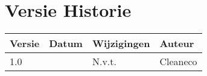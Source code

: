 \section*{Versie Historie} 

\begin{table}[h]
\begin{tabular}{|l|l|l|l|}
\hline
\rowcolor[HTML]{4472C4} 
{\color[HTML]{FFFFFF} \textbf{Versie}} &
  {\color[HTML]{FFFFFF} \textbf{Datum}} &
  {\color[HTML]{FFFFFF} \textbf{Wijzigingen}} &
  {\color[HTML]{FFFFFF} \textbf{Auteur}} \\ \hline
\rowcolor[HTML]{D9E1F2} 
1.0 &
  \multicolumn{1}{c|}{\cellcolor[HTML]{D9E1F2}\date{\today}} &
 N.v.t. &
  Cleaneco \\ \hline



\end{tabular}
\end{table}